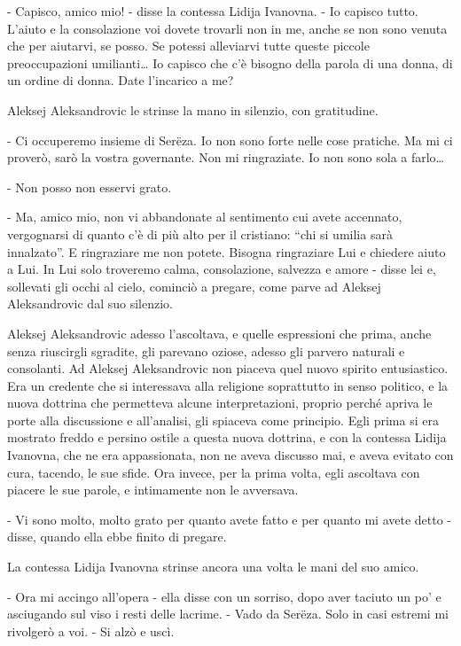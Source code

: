 - Capisco, amico mio! - disse la contessa Lidija Ivanovna. - Io capisco tutto. L'aiuto e la consolazione voi dovete trovarli non in me, anche se non sono venuta che per aiutarvi, se posso. Se potessi alleviarvi tutte queste piccole preoccupazioni umilianti\ldots{} Io capisco che c'è bisogno della parola di una donna, di un ordine di donna. Date l'incarico a me? 

Aleksej Aleksandrovic le strinse la mano in silenzio, con gratitudine. 

- Ci occuperemo insieme di Serëza. Io non sono forte nelle cose pratiche. Ma mi ci proverò, sarò la vostra governante. Non mi ringraziate. Io non sono sola a farlo\ldots{} 

- Non posso non esservi grato. 

- Ma, amico mio, non vi abbandonate al sentimento cui avete accennato, vergognarsi di quanto c'è di più alto per il cristiano: ``chi si umilia sarà innalzato''. E ringraziare me non potete. Bisogna ringraziare Lui e chiedere aiuto a Lui. In Lui solo troveremo calma, consolazione, salvezza e amore - disse lei e, sollevati gli occhi al cielo, cominciò a pregare, come parve ad Aleksej Aleksandrovic dal suo silenzio. 

Aleksej Aleksandrovic adesso l'ascoltava, e quelle espressioni che prima, anche senza riuscirgli sgradite, gli parevano oziose, adesso gli parvero naturali e consolanti. Ad Aleksej Aleksandrovic non piaceva quel nuovo spirito entusiastico. Era un credente che si interessava alla religione soprattutto in senso politico, e la nuova dottrina che permetteva alcune interpretazioni, proprio perché apriva le porte alla discussione e all'analisi, gli spiaceva come principio. Egli prima si era mostrato freddo e persino ostile a questa nuova dottrina, e con la contessa Lidija Ivanovna, che ne era appassionata, non ne aveva discusso mai, e aveva evitato con cura, tacendo, le sue sfide. Ora invece, per la prima volta, egli ascoltava con piacere le sue parole, e intimamente non le avversava. 

- Vi sono molto, molto grato per quanto avete fatto e per quanto mi avete detto - disse, quando ella ebbe finito di pregare. 

La contessa Lidija Ivanovna strinse ancora una volta le mani del suo amico. 

- Ora mi accingo all'opera - ella disse con un sorriso, dopo aver taciuto un po' e asciugando sul viso i resti delle lacrime. - Vado da Serëza. Solo in casi estremi mi rivolgerò a voi. - Si alzò e uscì. 

